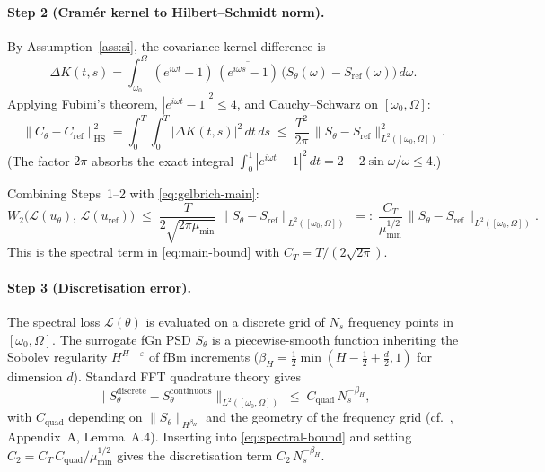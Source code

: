 \documentclass[11pt,a4paper]{article}
\newcommand{\HS}{\mathrm{HS}}
\begin{document}
\paragraph{Step 2 (Cram\'er kernel to Hilbert--Schmidt norm).}
By Assumption~\ref{ass:si}, the covariance kernel difference is
\[
 \Delta K(t,s) = \int_{\omega_0}^{\Omega}
  (e^{i\omega t}-1)\,\overline{(e^{i\omega s}-1)}\,
  \bigl(S_\theta(\omega)-S_{\mathrm{ref}}(\omega)\bigr)\,d\omega.
\]
Applying Fubini's theorem, $|e^{i\omega t}-1|^2 \leq 4$, and
Cauchy--Schwarz on $[\omega_0,\Omega]$:
\begin{equation}\label{eq:parseval-main}
 \bigl\|C_\theta - C_{\mathrm{ref}}\bigr\|_{\HS}^2
 = \int_0^T\!\!\int_0^T |\Delta K(t,s)|^2\,dt\,ds
 \;\leq\;
 \frac{T^2}{2\pi}\,
 \bigl\|S_\theta - S_{\mathrm{ref}}\bigr\|_{L^2([\omega_0,\Omega])}^2.
\end{equation}
(The factor $2\pi$ absorbs the exact integral
$\int_0^1|e^{i\omega t}-1|^2\,dt = 2-2\sin\omega/\omega \leq 4$.)

Combining Steps~1--2 with \eqref{eq:gelbrich-main}:
\begin{equation}\label{eq:spectral-bound}
 W_2\!\bigl(\mathcal{L}(u_\theta),\,\mathcal{L}(u_{\mathrm{ref}})\bigr)
 \;\leq\;
 \frac{T}{2\sqrt{2\pi\mu_{\min}}}\,
 \bigl\|S_\theta - S_{\mathrm{ref}}\bigr\|_{L^2([\omega_0,\Omega])}
 \;=:\;
 \frac{C_T}{\mu_{\min}^{1/2}}\,
 \bigl\|S_\theta - S_{\mathrm{ref}}\bigr\|_{L^2([\omega_0,\Omega])}.
\end{equation}
This is the spectral term in \eqref{eq:main-bound} with $C_T = T/(2\sqrt{2\pi})$.

\paragraph{Step 3 (Discretisation error).}
The spectral loss $\mathcal{L}(\theta)$ is evaluated on a discrete grid of
$N_s$ frequency points in $[\omega_0,\Omega]$. The surrogate fGn PSD
$S_\theta$ is a piecewise-smooth function inheriting the Sobolev
regularity $H^{H-\varepsilon}$ of fBm increments ($\beta_H =
\tfrac{1}{2}\min(H-\tfrac{1}{2}+\tfrac{d}{2},1)$ for dimension $d$).
Standard FFT quadrature theory gives
\[
 \bigl\|S_\theta^{\mathrm{discrete}} - S_\theta^{\mathrm{continuous}}
 \bigr\|_{L^2([\omega_0,\Omega])}
 \;\leq\; C_{\mathrm{quad}}\,N_s^{-\beta_H},
\]
with $C_{\mathrm{quad}}$ depending on $\|S_\theta\|_{H^{\beta_H}}$
and the geometry of the frequency grid
(cf.\ \citet{TODO-paper1}, Appendix~A, Lemma~A.4).
Inserting into \eqref{eq:spectral-bound} and setting
$C_2 = C_T\,C_{\mathrm{quad}}/\mu_{\min}^{1/2}$ gives the
discretisation term $C_2\,N_s^{-\beta_H}$.
\end{document}
